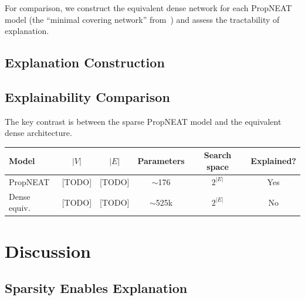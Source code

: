 \documentclass[11pt]{article}
\begin{document}
For comparison, we construct the equivalent dense network for each PropNEAT model (the ``minimal covering network'' from~\cite{merry2025propneat}) and assess the tractability of explanation.

\subsection{Explanation Construction}


\subsection{Explainability Comparison}

The key contrast is between the sparse PropNEAT model and the equivalent dense architecture.

\begin{center}
\begin{tabular}{lccccc}
\toprule
\textbf{Model} & $|V|$ & $|E|$ & \textbf{Parameters} & \textbf{Search space} & \textbf{Explained?} \\
\midrule
PropNEAT & [TODO] & [TODO] & $\sim$176 & $2^{|E|}$ & Yes \\
Dense equiv. & [TODO] & [TODO] & $\sim$525k & $2^{|E|}$ & No \\
\bottomrule
\end{tabular}
\end{center}



\section{Discussion}
\label{sec:discussion}

\subsection{Sparsity Enables Explanation}
\end{document}
